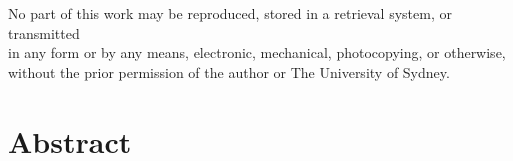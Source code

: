 \onehalfspacing

\restoregeometry
\onehalfspacing

\clearpage\null\thispagestyle{empty}
\begin{center}
    \vspace*{\fill}
    
    
    No part of this work may be reproduced, stored in a retrieval system, or transmitted \\
    in any form or by any means, electronic, mechanical, photocopying, or otherwise, \\
    without the prior permission of the author or The University of Sydney.
\end{center}

\chapter*{Abstract}



\newpage\thispagestyle{empty}
\tableofcontents